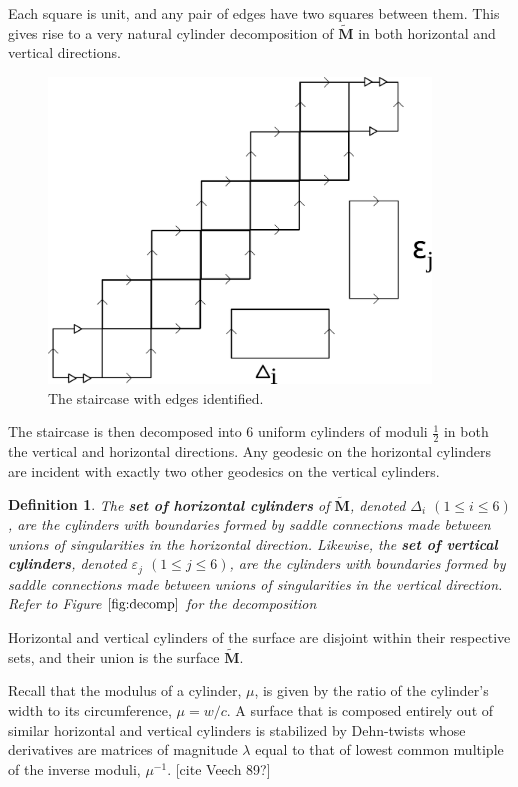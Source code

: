 \documentclass[]{article}
\newtheorem{Def}{Definition}[subsection]
\begin{document}
Each square is unit, and any pair of edges have two squares between them. This gives rise to a very natural cylinder decomposition of $\tilde{\mathbf{M}}$ in both horizontal and vertical directions.

\begin{figure}[H]
\centering
\includegraphics[width=4in]{cylinderdecomp.pdf}
\caption{The staircase with edges identified.}
\label{fig:decomp}
\end{figure}

The staircase is then decomposed into 6 uniform cylinders of moduli $\frac{1}{2}$ in both the vertical and horizontal directions. Any geodesic on the horizontal cylinders are incident with exactly two other geodesics on the vertical cylinders.

\begin{Def}
The \textbf{set of horizontal cylinders} of $\tilde{\mathbf{M}}$, denoted $\Delta_{i}$ $(1\leq i \leq 6)$, are the cylinders with boundaries formed by saddle connections made between unions of singularities in the horizontal direction. \newline
Likewise, the \textbf{set of vertical cylinders}, denoted $\varepsilon_j$ $(1\leq j 
\leq 6)$, are the cylinders with boundaries formed by saddle connections made between unions of singularities in the vertical direction. \newline
Refer to Figure $\ref{fig:decomp}$ for the decomposition
\end{Def}

Horizontal and vertical cylinders of the surface are disjoint within their respective sets, and their union is the surface $\tilde{\mathbf{M}}$.

  Recall that the modulus of a cylinder, $\mu$, is given by the ratio of the cylinder's width to its circumference, $\mu{}={}w/c$. A surface that is composed entirely out of similar horizontal and vertical cylinders is stabilized by Dehn-twists whose derivatives are matrices of magnitude $\lambda$ equal to that of lowest common multiple of the inverse moduli, $\mu^{-1}$. [cite Veech 89?]
\end{document}
